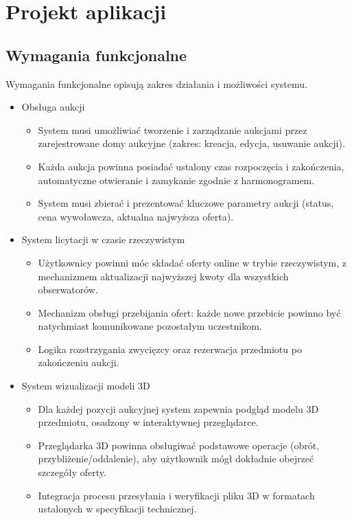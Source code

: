 \section{Projekt aplikacji}
\label{sec:projekt}

\subsection{Wymagania funkcjonalne}
Wymagania funkcjonalne opisują zakres działania i możliwości systemu.
\begin{itemize}
    \item Obsługa aukcji
          \begin{itemize}
              \item System musi umożliwiać tworzenie i zarządzanie aukcjami przez zarejestrowane domy aukcyjne (zakres: kreacja, edycja, usuwanie aukcji).
              \item Każda aukcja powinna posiadać ustalony czas rozpoczęcia i zakończenia, automatyczne otwieranie i zamykanie zgodnie z harmonogramem.
              \item System musi zbierać i prezentować kluczowe parametry aukcji (status, cena wywoławcza, aktualna najwyższa oferta).
          \end{itemize}
    \item System licytacji w czasie rzeczywistym
          \begin{itemize}
              \item Użytkownicy powinni móc składać oferty online w trybie rzeczywistym, z mechanizmem aktualizacji najwyższej kwoty dla wszystkich obserwatorów.
              \item Mechanizm obsługi przebijania ofert: każde nowe przebicie powinno być natychmiast komunikowane pozostałym uczestnikom.
              \item Logika rozstrzygania zwycięzcy oraz rezerwacja przedmiotu po zakończeniu aukcji.
          \end{itemize}
    \item System wizualizacji modeli 3D
          \begin{itemize}
              \item Dla każdej pozycji aukcyjnej system zapewnia podgląd modelu 3D przedmiotu, osadzony w interaktywnej przeglądarce.
              \item Przeglądarka 3D powinna obsługiwać podstawowe operacje (obrót, przybliżenie/oddalenie), aby użytkownik mógł dokładnie obejrzeć szczegóły oferty.
              \item Integracja procesu przesyłania i weryfikacji pliku 3D w formatach ustalonych w specyfikacji technicznej.

\end{itemize}
\end{itemize}
